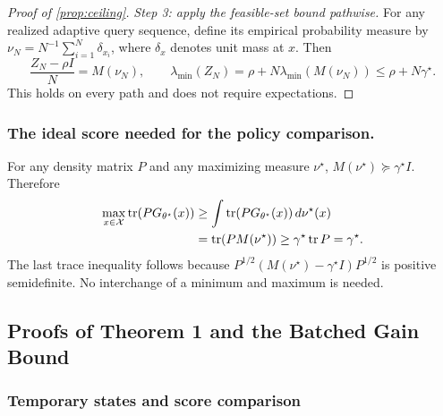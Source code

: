 \documentclass[10pt,twoside,letterpaper]{article}
\newcommand{\tr}{\operatorname{tr}}
\begin{document}
\begin{proof}[Proof of \cref{prop:ceiling}]
\textit{Step 3: apply the feasible-set bound pathwise.}
For any realized adaptive query sequence, define its empirical
probability measure by $\nu_N=N^{-1}\sum_{i=1}^N\delta_{x_i}$,
where $\delta_x$ denotes unit mass at $x$. Then
\begin{equation}
\frac{Z_N-\rho I}{N}=M(\nu_N),\qquad
\lambda_{\min}(Z_N)=\rho+N\lambda_{\min}(M(\nu_N))
\le\rho+N\gamma^\star.
\label{eq:app-pathwise-ceiling}
\end{equation}
This holds on every path and does not require expectations.
\end{proof}

\subsubsection*{The ideal score needed for the policy comparison.}
For any density matrix $P$ and any maximizing measure $\nu^\star$,
$M(\nu^\star)\succeq\gamma^\star I$. Therefore
\begin{align}
\max_{x\in\mathcal X}\tr(PG_{\theta^\star}(x))
&\ge\int\tr(PG_{\theta^\star}(x))\,d\nu^\star(x)\notag\\
&=\tr(PM(\nu^\star))
\ge\gamma^\star\tr P=\gamma^\star.
\label{eq:app-ideal-score}
\end{align}
The last trace inequality follows because
$P^{1/2}(M(\nu^\star)-\gamma^\star I)P^{1/2}$ is positive semidefinite.
No interchange of a minimum and maximum is needed.

\subsection{Proofs of Theorem 1 and the Batched Gain Bound}
\label{app:information}

\subsubsection{Temporary states and score comparison}
\end{document}
